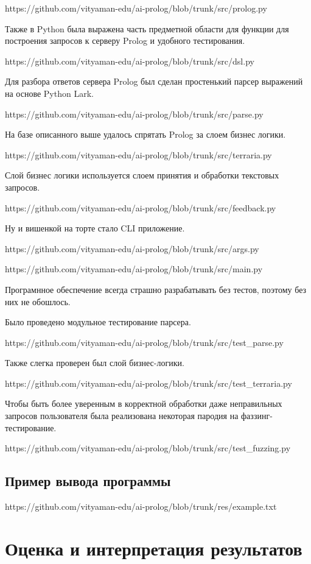 \documentclass{article}
\begin{document}
https://github.com/vityaman-edu/ai-prolog/blob/trunk/src/prolog.py

Также в Python была выражена часть предметной области для
функции для построения запросов к серверу Prolog и
удобного тестирования.

https://github.com/vityaman-edu/ai-prolog/blob/trunk/src/dsl.py

Для разбора ответов сервера Prolog был сделан простенький
парсер выражений на основе Python Lark.

https://github.com/vityaman-edu/ai-prolog/blob/trunk/src/parse.py

На базе описанного выше удалось спрятать Prolog за слоем
бизнес логики.

https://github.com/vityaman-edu/ai-prolog/blob/trunk/src/terraria.py

Слой бизнес логики используется слоем принятия и обработки
текстовых запросов.

https://github.com/vityaman-edu/ai-prolog/blob/trunk/src/feedback.py

Ну и вишенкой на торте стало CLI приложение.

https://github.com/vityaman-edu/ai-prolog/blob/trunk/src/args.py

https://github.com/vityaman-edu/ai-prolog/blob/trunk/src/main.py

Програмнное обеспечение всегда страшно разрабатывать без тестов,
поэтому без них не обошлось.

Было проведено модульное тестирование парсера.

https://github.com/vityaman-edu/ai-prolog/blob/trunk/src/test_parse.py

Также слегка проверен был слой бизнес-логики.

https://github.com/vityaman-edu/ai-prolog/blob/trunk/src/test_terraria.py

Чтобы быть более уверенным в корректной обработки
даже неправильных запросов пользователя была реализована
некоторая пародия на фаззинг-тестирование.

https://github.com/vityaman-edu/ai-prolog/blob/trunk/src/test_fuzzing.py

\subsection{Пример вывода программы}

https://github.com/vityaman-edu/ai-prolog/blob/trunk/res/example.txt


\section{Оценка и интерпретация результатов}
\end{document}
